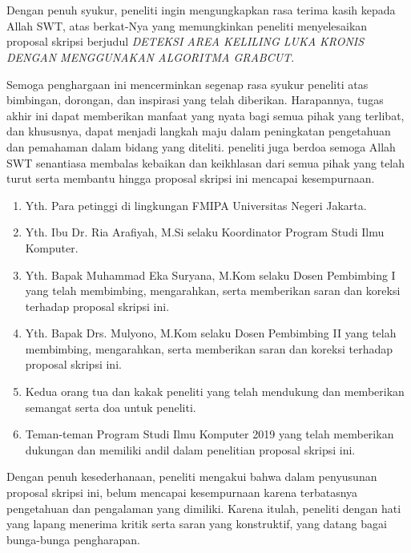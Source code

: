 \chapter*{}
\onehalfspacing{}
Dengan penuh syukur, peneliti ingin mengungkapkan rasa terima kasih kepada Allah SWT, 
atas berkat-Nya yang memungkinkan peneliti menyelesaikan proposal skripsi berjudul 
\textit{DETEKSI AREA KELILING LUKA KRONIS DENGAN MENGGUNAKAN ALGORITMA GRABCUT}.

Semoga penghargaan ini mencerminkan segenap rasa syukur peneliti atas bimbingan, 
dorongan, dan inspirasi yang telah diberikan. Harapannya, tugas akhir ini dapat 
memberikan manfaat yang nyata bagi semua pihak yang terlibat, dan khususnya, dapat 
menjadi langkah maju dalam peningkatan pengetahuan dan pemahaman dalam bidang yang 
diteliti. peneliti juga berdoa semoga Allah SWT senantiasa membalas kebaikan dan 
keikhlasan dari semua pihak yang telah turut serta membantu hingga proposal skripsi 
ini mencapai kesempurnaan.

\begin{enumerate}

	\item{Yth. Para petinggi di lingkungan FMIPA Universitas Negeri Jakarta.}
	\item{Yth. Ibu Dr. Ria Arafiyah, M.Si selaku Koordinator Program Studi Ilmu
		Komputer.}
	\item{Yth. Bapak Muhammad Eka Suryana, M.Kom selaku Dosen Pembimbing I yang
		telah membimbing, mengarahkan, serta memberikan saran dan koreksi terhadap
		proposal skripsi ini.}
	\item{Yth. Bapak Drs. Mulyono, M.Kom selaku Dosen Pembimbing II yang telah
		membimbing, mengarahkan, serta memberikan saran dan koreksi terhadap
		proposal skripsi ini.}
	\item{Kedua orang tua dan kakak peneliti yang telah mendukung dan memberikan 
		semangat serta doa untuk peneliti.}
	\item{Teman-teman Program Studi Ilmu Komputer 2019 yang telah memberikan 
		dukungan dan memiliki andil dalam penelitian proposal skripsi ini.}
	
\end{enumerate}

Dengan penuh kesederhanaan, peneliti mengakui bahwa dalam penyusunan proposal skripsi 
ini, belum mencapai kesempurnaan karena terbatasnya pengetahuan dan pengalaman 
yang dimiliki. Karena itulah, peneliti dengan hati yang lapang menerima kritik 
serta saran yang konstruktif, yang datang bagai bunga-bunga pengharapan.

